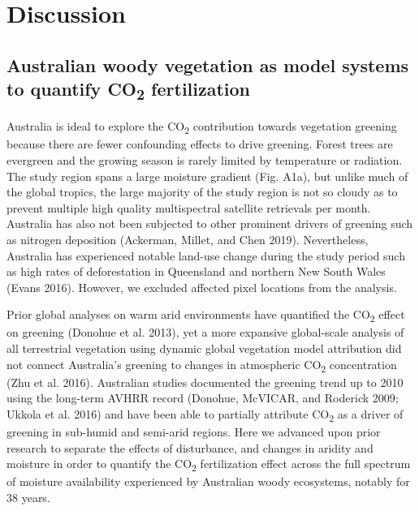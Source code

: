 \documentclass[
]{article}
\begin{document}
\hypertarget{discussion}{%
\section{Discussion}\label{discussion}}

\hypertarget{australian-woody-vegetation-as-model-systems-to-quantify-co2-fertilization}{%
\subsection{\texorpdfstring{Australian woody vegetation as model systems
to quantify CO\textsubscript{2}
fertilization}{Australian woody vegetation as model systems to quantify CO2 fertilization}}\label{australian-woody-vegetation-as-model-systems-to-quantify-co2-fertilization}}

Australia is ideal to explore the CO\textsubscript{2} contribution
towards vegetation greening because there are fewer confounding effects
to drive greening. Forest trees are evergreen and the growing season is
rarely limited by temperature or radiation. The study region spans a
large moisture gradient (Fig. A1a), but unlike much of the global
tropics, the large majority of the study region is not so cloudy as to
prevent multiple high quality multispectral satellite retrievals per
month. Australia has also not been subjected to other prominent drivers
of greening such as nitrogen deposition (Ackerman, Millet, and Chen
2019). Nevertheless, Australia has experienced notable land-use change
during the study period such as high rates of deforestation in
Queensland and northern New South Wales (Evans 2016). However, we
excluded affected pixel locations from the analysis.

Prior global analyses on warm arid environments have quantified the
CO\textsubscript{2} effect on greening (Donohue et al. 2013), yet a more
expansive global-scale analysis of all terrestrial vegetation using
dynamic global vegetation model attribution did not connect Australia's
greening to changes in atmospheric CO\textsubscript{2} concentration
(Zhu et al. 2016). Australian studies documented the greening trend up
to 2010 using the long-term AVHRR record (Donohue, McVICAR, and Roderick
2009; Ukkola et al. 2016) and have been able to partially attribute
CO\textsubscript{2} as a driver of greening in sub-humid and semi-arid
regions. Here we advanced upon prior research to separate the effects of
disturbance, and changes in aridity and moisture in order to quantify
the CO\textsubscript{2} fertilization effect across the full spectrum of
moisture availability experienced by Australian woody ecosystems,
notably for 38 years.
\end{document}
